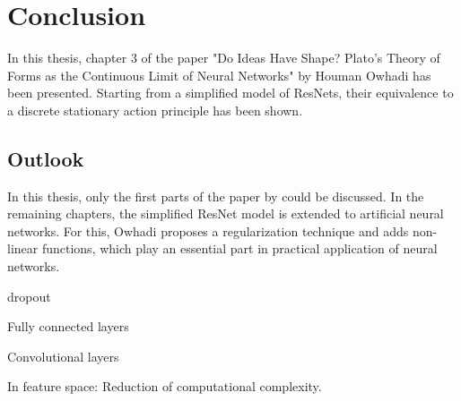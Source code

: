 \section{Conclusion}

In this thesis, chapter 3 of the paper "Do Ideas Have Shape? Plato's Theory of Forms as the Continuous Limit of Neural Networks" by Houman Owhadi has been presented.
Starting from a simplified model of ResNets, their equivalence to a discrete stationary action principle has been shown.


\subsection{Outlook}

In this thesis, only the first parts of the paper by \citet{owhadi20} could be discussed.
In the remaining chapters, the simplified ResNet model is extended to artificial neural networks.
For this, Owhadi proposes a regularization technique and adds non-linear functions, which play an essential part in practical application of neural networks.



dropout

Fully connected layers

Convolutional layers

In feature space: Reduction of computational complexity.